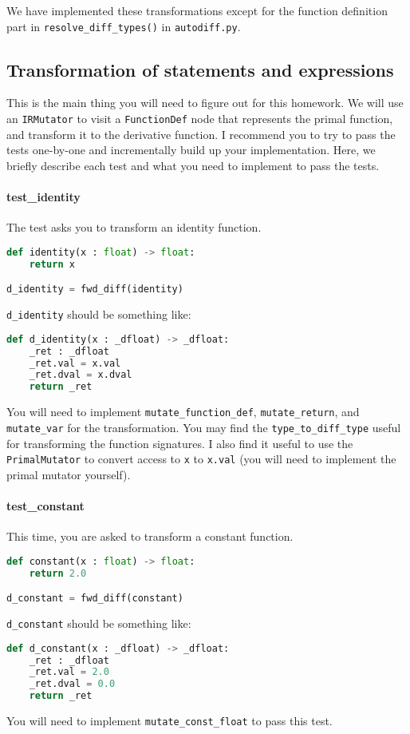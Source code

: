 We have implemented these transformations except for the function definition part in \lstinline{resolve_diff_types()} in \lstinline{autodiff.py}.

\subsection{Transformation of statements and expressions}
This is the main thing you will need to figure out for this homework. We will use an \lstinline{IRMutator} to visit a \lstinline{FunctionDef} node that represents the primal function, and transform it to the derivative function. I recommend you to try to pass the tests one-by-one and incrementally build up your implementation. Here, we briefly describe each test and what you need to implement to pass the tests.

\paragraph{test_identity} The test asks you to transform an identity function.
\begin{lstlisting}[language=Python]
def identity(x : float) -> float:
    return x

d_identity = fwd_diff(identity)
\end{lstlisting}
\lstinline{d_identity} should be something like:
\begin{lstlisting}[language=Python]
def d_identity(x : _dfloat) -> _dfloat:
	_ret : _dfloat
	_ret.val = x.val
	_ret.dval = x.dval
	return _ret
\end{lstlisting}
You will need to implement \lstinline{mutate_function_def}, \lstinline{mutate_return}, and \lstinline{mutate_var} for the transformation. You may find the \lstinline{type_to_diff_type} useful for transforming the function signatures. I also find it useful to use the \lstinline{PrimalMutator} to convert access to \lstinline{x} to \lstinline{x.val} (you will need to implement the primal mutator yourself).

\paragraph{test_constant} This time, you are asked to transform a constant function.
\begin{lstlisting}[language=Python]
def constant(x : float) -> float:
    return 2.0

d_constant = fwd_diff(constant)
\end{lstlisting}
\lstinline{d_constant} should be something like:
\begin{lstlisting}[language=Python]
def d_constant(x : _dfloat) -> _dfloat:
	_ret : _dfloat
	_ret.val = 2.0
	_ret.dval = 0.0
	return _ret
\end{lstlisting}
You will need to implement \lstinline{mutate_const_float} to pass this test.

